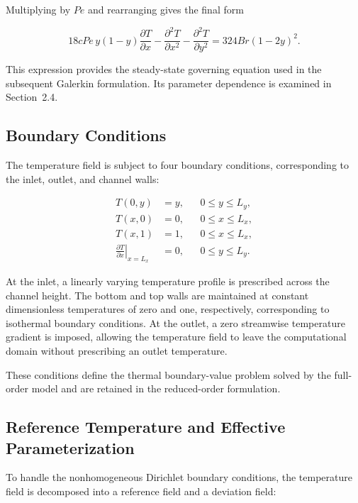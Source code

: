 Multiplying by $Pe$ and rearranging gives the final form

\begin{equation}
    \boxed{
        18cPe\,y(1-y)\frac{\partial T}{\partial x}
        -\frac{\partial^2 T}{\partial x^2}
        -\frac{\partial^2 T}{\partial y^2}
        =
        324Br(1-2y)^2.
    }
    \label{eq:energy_parameterized}
\end{equation}

This expression provides the steady-state governing equation
used in the subsequent Galerkin formulation. Its parameter
dependence is examined in Section~2.4.

\subsection{Boundary Conditions}

The temperature field is subject to four boundary conditions, corresponding to the inlet, outlet, and channel walls:

\begin{align}
    T(0,y) &= y,
    && 0\leq y\leq L_y,
    \label{eq:bc_inlet}\\
    T(x,0) &= 0,
    && 0\leq x\leq L_x,
    \label{eq:bc_bottom}\\
    T(x,1) &= 1,
    && 0\leq x\leq L_x,
    \label{eq:bc_top}\\
    \left.\frac{\partial T}{\partial x}\right|_{x=L_x}
    &=0,
    && 0\leq y\leq L_y.
    \label{eq:bc_outlet}
\end{align}

At the inlet, a linearly varying temperature profile is prescribed across the channel height. The bottom and top walls are maintained at constant dimensionless temperatures of zero and one, respectively, corresponding to isothermal boundary conditions. At the outlet, a zero streamwise temperature gradient is imposed, allowing the temperature field to leave the computational domain without prescribing an outlet temperature.

These conditions define the thermal boundary-value problem solved by the full-order model and are retained in the reduced-order formulation.

\subsection{Reference Temperature and Effective Parameterization}

To handle the nonhomogeneous Dirichlet boundary conditions, the temperature field is decomposed into a reference field and a deviation field:

